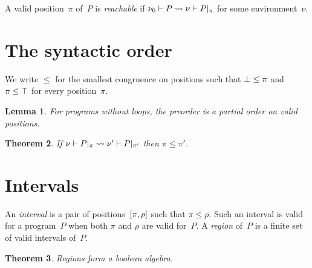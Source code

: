 \documentclass[a4paper]{article}
\theoremstyle{theorem}
\newtheorem{theorem}{Theorem}
\newtheorem{lemma}[theorem]{Lemma}
\theoremstyle{example}
\theoremstyle{remark}
\begin{document}
\noindent
A valid position~$\pi$ of~$P$ is \emph{reachable} if
$\penv{\nu_0} P\redto\penv\nu{\postate\pi P}$ for some environment~$\nu$.

\section{The syntactic order}
We write $\leq$ for the smallest congruence on positions such that
$\pbot\leq\pi$ and $\pi\leq\ptop$ for every position~$\pi$.

\begin{lemma}
  For programs without loops, the preorder is a partial order on valid
  positions.
\end{lemma}

\begin{theorem}
  If $\penv\nu{\postate\pi P}\redto\penv{\nu'}{\postate{\pi'}P}$ then
  $\pi\leq\pi'$.
\end{theorem}

\section{Intervals}
An \emph{interval} is a pair of positions~$\intv\pi\rho$ such that
$\pi\leq\rho$. Such an interval is valid for a program~$P$ when both $\pi$ and
$\rho$ are valid for~$P$. A \emph{region} of~$P$ is a finite set of valid
intervals of~$P$.

\begin{theorem}
  Regions form a boolean algebra.
\end{theorem}
\end{document}
